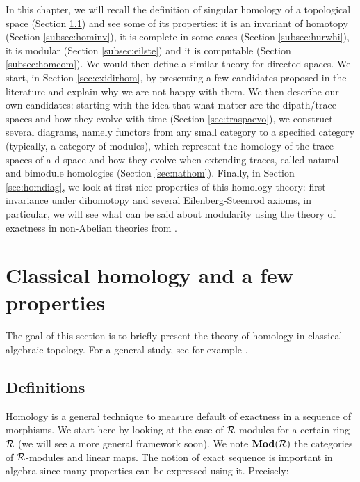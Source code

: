 In this chapter, we will recall the definition of singular homology of a topological space (Section \ref{subsec:homdef}) and see some of its properties: it is an invariant of homotopy (Section \ref{subsec:hominv}), it is complete in some cases (Section \ref{subsec:hurwhi}), it is modular (Section \ref{subsec:eilste}) and it is computable (Section \ref{subsec:homcom}). We would then define a similar theory for directed spaces. We start, in Section \ref{sec:exidirhom}, by presenting a few candidates proposed in the literature and explain why we are not happy with them. We then describe our own candidates: starting with the idea that what matter are the dipath/trace spaces and how they evolve with time (Section \ref{sec:traspaevo}), we construct several diagrams, namely functors from any small category to a specified category (typically, a category of modules), which represent the homology of the trace spaces of a d-space and how they evolve when extending traces, called natural and bimodule homologies (Section \ref{sec:nathom}). Finally, in Section \ref{sec:homdiag}, we look at first nice properties of this homology theory: first invariance under dihomotopy and several Eilenberg-Steenrod axioms, in particular, we will see what can be said about modularity using the theory of exactness in non-Abelian theories from \cite{grandis91}.

\section{Classical homology and a few properties}


The goal of this section is to briefly present the theory of homology in classical algebraic topology. For a general study, see for example \cite{hatcher02}. 

\subsection{Definitions}
\label{subsec:homdef}

Homology is a general technique to measure default of exactness in a sequence of morphisms. We start here by looking at the case of $\mathcal{R}$-modules for a certain ring $\mathcal{R}$ (we will see a more general framework soon). We note $\textbf{Mod}(\mathcal{R})$ the categories of $\mathcal{R}$-modules and linear maps. The notion of exact sequence is important in algebra since many properties can be expressed using it. Precisely:


